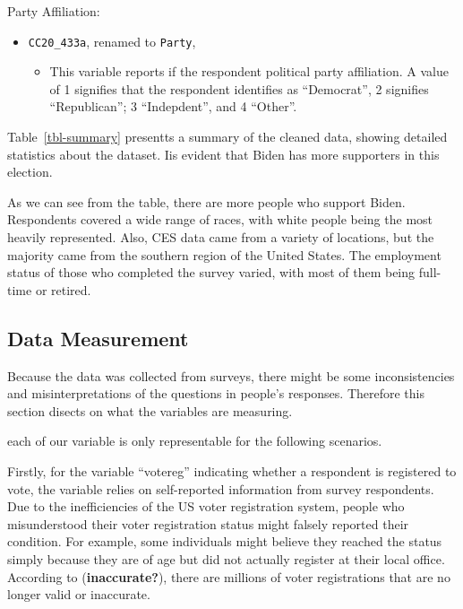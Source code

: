\documentclass[
  letterpaper,
  DIV=11,
  numbers=noendperiod]{scrartcl}
\providecommand{\tightlist}{%
  \setlength{\itemsep}{0pt}\setlength{\parskip}{0pt}}\usepackage{longtable,booktabs,array}
\begin{document}
Party Affiliation:

\begin{itemize}
\item
  \texttt{CC20\_433a}, renamed to \texttt{Party},

  \begin{itemize}
  \tightlist
  \item
    This variable reports if the respondent political party affiliation.
    A value of 1 signifies that the respondent identifies as
    ``Democrat'', 2 signifies ``Republican''; 3 ``Indepdent'', and 4
    ``Other''.
  \end{itemize}
\end{itemize}

Table~\ref{tbl-summary} presentts a summary of the cleaned data, showing
detailed statistics about the dataset. Iis evident that Biden has more
supporters in this election.

As we can see from the table, there are more people who support Biden.
Respondents covered a wide range of races, with white people being the
most heavily represented. Also, CES data came from a variety of
locations, but the majority came from the southern region of the United
States. The employment status of those who completed the survey varied,
with most of them being full-time or retired.

\hypertarget{data-measurement}{%
\subsection{Data Measurement}\label{data-measurement}}

Because the data was collected from surveys, there might be some
inconsistencies and misinterpretations of the questions in people's
responses. Therefore this section disects on what the variables are
measuring.

each of our variable is only representable for the following scenarios.

Firstly, for the variable ``votereg'' indicating whether a respondent is
registered to vote, the variable relies on self-reported information
from survey respondents. Due to the inefficiencies of the US voter
registration system, people who misunderstood their voter registration
status might falsely reported their condition. For example, some
individuals might believe they reached the status simply because they
are of age but did not actually register at their local office.
According to (\textbf{inaccurate?}), there are millions of voter
registrations that are no longer valid or inaccurate.
\end{document}
